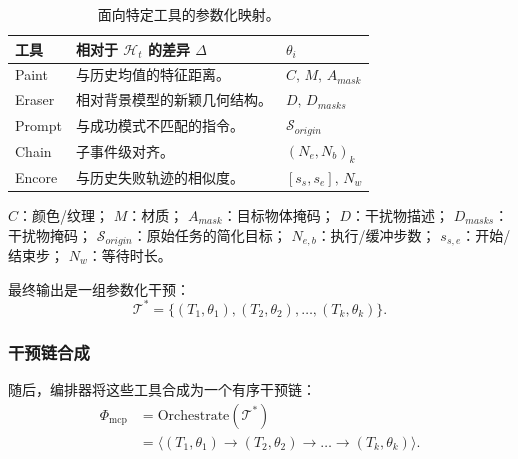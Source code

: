 \begin{table}[htbp]
\vspace{-1.5em}
\centering
\caption{面向特定工具的参数化映射。}
\label{tab:parameterization_formal}
\footnotesize
\renewcommand{\arraystretch}{1.25}
\begin{tabularx}{\columnwidth}{@{} l X l @{}}
\toprule
\textbf{工具} & \textbf{相对于 $\mathcal{H}_t$ 的差异 $\Delta$} & \textbf{$\theta_i$} \\
\midrule
Paint  & 与历史均值的特征距离。         & $C,\,M,\,A_{mask}$ \\
Eraser & 相对背景模型的新颖几何结构。   & $D,\,D_{masks}$ \\
Prompt & 与成功模式不匹配的指令。       & $\mathcal{S}_{origin}$ \\
Chain  & 子事件级对齐。                 & $(N_{e},N_{b})_k$ \\
Encore & 与历史失败轨迹的相似度。       & $[s_s,s_e],\,N_w$ \\
\bottomrule
\end{tabularx}
\vspace{3pt}
\begin{flushleft}
\scriptsize
\textbf{$C$}：颜色/纹理；\enspace
\textbf{$M$}：材质；\enspace
\textbf{$A_{mask}$}：目标物体掩码；\enspace
\textbf{$D$}：干扰物描述；\enspace
\textbf{$D_{masks}$}：干扰物掩码；\enspace
\textbf{$\mathcal{S}_{origin}$}：原始任务的简化目标；\enspace
\textbf{$N_{e,b}$}：执行/缓冲步数；\enspace
\textbf{$s_{s,e}$}：开始/结束步；\enspace
\textbf{$N_w$}：等待时长。
\end{flushleft}
\vspace{-0.5em}
\end{table}

最终输出是一组参数化干预：
\begin{equation}
\mathcal{T}^* = \{(T_1, \theta_1), (T_2, \theta_2), \dots, (T_k, \theta_k)\}.
\end{equation}

\subsubsection{干预链合成}

随后，编排器将这些工具合成为一个有序干预链：
\begin{equation}
\begin{aligned}
\Phi_{\text{mcp}} &= \text{Orchestrate}(\mathcal{T}^*) \\
&= \big\langle (T_1, \theta_1) \rightarrow (T_2, \theta_2) \rightarrow \dots \rightarrow (T_k, \theta_k) \big\rangle.
\end{aligned}
\end{equation}

